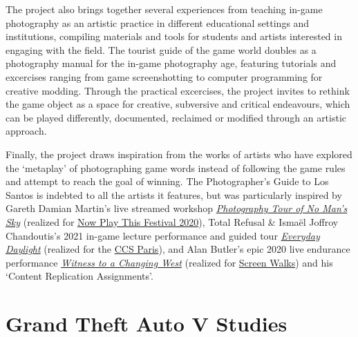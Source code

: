 \documentclass[
  openany]{book}
\begin{document}
The project also brings together several experiences from teaching in-game photography as an artistic practice in different educational settings and institutions, compiling materials and tools for students and artists interested in engaging with the field. The tourist guide of the game world doubles as a photography manual for the in-game photography age, featuring tutorials and excercises ranging from game screenshotting to computer programming for creative modding. Through the practical excercises, the project invites to rethink the game object as a space for creative, subversive and critical endeavours, which can be played differently, documented, reclaimed or modified through an artistic approach.

Finally, the project draws inspiration from the works of artists who have explored the `metaplay' of photographing game words instead of following the game rules and attempt to reach the goal of winning. The Photographer's Guide to Los Santos is indebted to all the artists it features, but was particularly inspired by Gareth Damian Martin's live streamed workshop \href{https://www.twitch.tv/videos/591840067}{\emph{Photography Tour of No Man's Sky}} (realized for \href{https://www.somersethouse.org.uk/whats-on/now-play-this-2020}{Now Play This Festival 2020}), Total Refusal \& Ismaël Joffroy Chandoutis's 2021 in-game lecture performance and guided tour \href{https://vimeo.com/506064357}{\emph{Everyday Daylight}} (realized for the \href{https://ccsparis.com/en/events/total-refusal-digital-disarmament-movement-a-la-gaite-lyrique/}{CCS Paris}), and Alan Butler's epic 2020 live endurance performance \href{https://www.youtube.com/watch?v=R4Q2G6tOQ_Q}{\emph{Witness to a Changing West}} (realized for \href{https://screenwalks.com/}{Screen Walks}) and his `Content Replication Assignments'.

\hypertarget{grand-theft-auto-v-studies}{%
\section{Grand Theft Auto V Studies}\label{grand-theft-auto-v-studies}}
\end{document}
